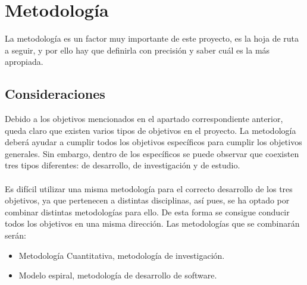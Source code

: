 \chapter{Metodología}
\thispagestyle{fancy}

La metodología es un factor muy importante de este proyecto, es la hoja de ruta a seguir, y por ello hay que definirla con precisión y saber cuál es la más apropiada.

\section{Consideraciones}
Debido a los objetivos mencionados en el apartado correspondiente anterior, queda claro que existen varios tipos de objetivos en el proyecto. La metodología deberá ayudar a cumplir todos los objetivos específicos para cumplir los objetivos generales. Sin embargo, dentro de los específicos se puede observar que coexisten tres tipos diferentes: de desarrollo, de investigación y de estudio.
\\ \\
Es difícil utilizar una misma metodología para el correcto desarrollo de los tres objetivos, ya que pertenecen a distintas disciplinas, así pues, se ha optado por combinar distintas metodologías para ello. De esta forma se consigue conducir todos los objetivos en una misma dirección. Las metodologías que se combinarán serán:
\begin{itemize}
    \item Metodología Cuantitativa, metodología de investigación.
    \item Modelo espiral, metodología de desarrollo de software.
\end{itemize}

